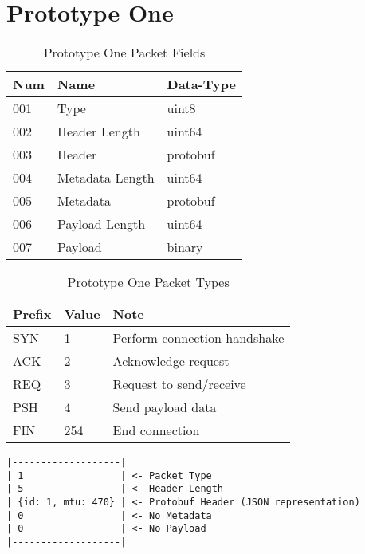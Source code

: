 \section{Prototype One}
\begin{table}[h!]
	\caption{Prototype One Packet Fields}
	\label{tab:p1d-packet-fields}
	\centering
	\begin{tabular}{ l l l }
		\hline
		\textbf{Num} & \textbf{Name}   & \textbf{Data-Type} \\
		\hline
		001          & Type            & uint8              \\
		\hline
		002          & Header Length   & uint64             \\
		\hline
		003          & Header          & protobuf           \\
		\hline
		004          & Metadata Length & uint64             \\
		\hline
		005          & Metadata        & protobuf           \\
		\hline
		006          & Payload Length  & uint64             \\
		\hline
		007          & Payload         & binary             \\
		\hline
	\end{tabular}
\end{table}

\begin{table}[h!]
	\caption{Prototype One Packet Types}
	\label{tab:p1d-packet-types}
	\centering
	\begin{tabular}{ l l l }
		\hline
		\textbf{Prefix} & \textbf{Value} & \textbf{Note}                \\
		\hline
		SYN             & 1              & Perform connection handshake \\
		\hline
		ACK             & 2              & Acknowledge request          \\
		\hline
		REQ             & 3              & Request to send/receive      \\
		\hline
		PSH             & 4              & Send payload data            \\
		\hline
		FIN             & 254            & End connection               \\
		\hline
	\end{tabular}
\end{table}

\begin{lstlisting}[float,caption={Prototype One Example Packet Structure},label=lst:p1d-example-structure]
|-------------------|
| 1                 | <- Packet Type
| 5                 | <- Header Length
| {id: 1, mtu: 470} | <- Protobuf Header (JSON representation)
| 0                 | <- No Metadata
| 0                 | <- No Payload
|-------------------|
\end{lstlisting}

